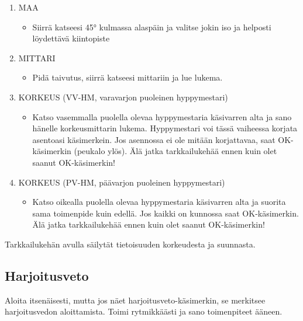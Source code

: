 \begin{enumerate}[label=\bfseries \arabic*)]
\item  MAA 
	\begin{itemize}
	\item  Siirrä katseesi 45° kulmassa alaspäin ja valitse jokin iso ja helposti löydettävä kiintopiste 
	\end{itemize}
\item  MITTARI 
	\begin{itemize}
	\item  Pidä taivutus, siirrä katseesi mittariin ja lue lukema. 
	\end{itemize}
\item  KORKEUS (VV-HM, varavarjon puoleinen hyppymestari) 
	\begin{itemize}
	\item  Katso vasemmalla puolella olevaa hyppymestaria käsivarren alta ja sano hänelle korkeusmittarin lukema. Hyppymestari voi tässä vaiheessa korjata asentoasi käsimerkein. Jos asennossa ei ole mitään korjattavaa, saat OK-käsimerkin (peukalo ylös). Älä jatka tarkkailukehää ennen kuin olet saanut OK-käsimerkin! 
	\end{itemize}
\item  KORKEUS (PV-HM, päävarjon puoleinen hyppymestari) 
	\begin{itemize}
	\item  Katso oikealla puolella olevaa hyppymestaria käsivarren alta ja suorita sama toimenpide kuin edellä. Jos kaikki on kunnossa saat OK-käsimerkin. Älä jatka tarkkailukehää ennen kuin olet saanut OK-käsimerkin! 
	\end{itemize}
\end{enumerate}

Tarkkailukehän avulla säilytät tietoisuuden korkeudesta ja suunnasta.  

\subsection{Harjoitusveto}
\label{nova-alkeiskoulutuksen-suoritukset-harjoitusveto}


Aloita itsenäisesti, mutta jos näet harjoitusveto-käsimerkin, se merkitsee harjoitusvedon aloittamista. Toimi rytmikkäästi ja sano toimenpiteet ääneen. 

